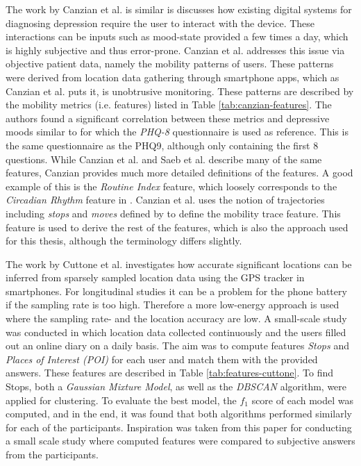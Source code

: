 
The work by Canzian et al. is similar is discusses how existing digital systems for diagnosing depression require the user to interact with the device. These interactions can be inputs such as mood-state provided a few times a day, which is highly subjective and thus error-prone. Canzian et al. addresses this issue via objective patient data, namely the mobility patterns of users. These patterns were derived from location data gathering through smartphone apps, which as Canzian et al. puts it, is unobtrusive monitoring. These patterns are described by the mobility metrics (i.e. features) listed in Table \ref{tab:canzian-features}. The authors found a significant correlation between these metrics and depressive moods similar to \cite{Saeb2015} for which the \textit{PHQ-8} questionnaire is used as  reference. This is the same questionnaire as the PHQ9, although only containing the first 8 questions. While Canzian et al. and Saeb et al. describe many of the same features, Canzian provides much more detailed definitions of the features. A good example of this is the \textit{Routine Index} feature, which loosely corresponds to the \textit{Circadian Rhythm} feature in \cite{Saeb2015}. Canzian et al. \cite{Canzian2015} uses the notion of trajectories including \textit{stops} and \textit{moves} defined by \cite{trajectories2008} to define the mobility trace feature. This feature is used to derive the rest of the features, which is also the approach used for this thesis, although the terminology differs slightly.

The work by Cuttone et al. \cite{sparse-location-2014} investigates how accurate significant locations can be inferred from sparsely sampled location data using the GPS tracker in smartphones. For longitudinal studies it can be a problem for the phone battery if the sampling rate is too high. Therefore a more low-energy approach is used where the sampling rate- and the location accuracy are low. A small-scale study was conducted in which location data collected continuously and the users filled out an online diary on a daily basis. The aim was to compute features \textit{Stops} and \textit{Places of Interest (POI)} for each user and match them with the provided answers. These features are described in Table \ref{tab:features-cuttone}.  To find Stops, both a \textit{Gaussian Mixture Model}, as well as the \textit{DBSCAN} algorithm, were applied for clustering. To evaluate the best model, the $f_1$ score of each model was computed, and in the end, it was found that both algorithms performed similarly for each of the participants. Inspiration was taken from this paper for conducting a small scale study where computed features were compared to subjective answers from the participants. 

